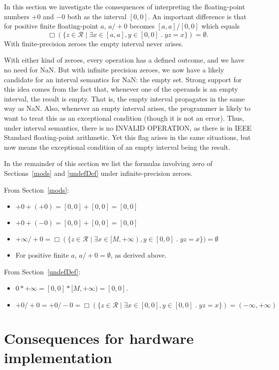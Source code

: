 \documentclass[11pt]{article}
\newcommand{\R}{\mathcal{R}}
\begin{document}
In this section we investigate the consequences of interpreting the
floating-point numbers $+0$ and $-0$ both as the interval $[0,0]$.  An
important difference is that for positive finite floating-point $a$,
$a/+0$ becomes $[a,a]/[0,0]$ which equals
$$\Box(\{z \in \R  \mid \exists x \in [a,a], y \in [0,0] \;.\;
yz = x \}) = \emptyset.$$
With finite-precision zeroes the empty interval never arises.

With either kind of zeroes, every operation has a defined outcome, and
we have no need for NaN.  But with infinite precision zeroes, we
now have a likely candidate for an interval semantics for NaN: the
empty set. Strong support for this idea comes from the fact that,
whenever one of the operands is an empty interval, the result is
empty. That is, the empty interval propagates in the same way as
NaN. Also, whenever an empty interval arises, the programmer is likely to
want to treat this as an exceptional condition (though it is not an
error). Thus, under interval semantics, there is no INVALID OPERATION,
as there is in IEEE Standard floating-point arithmetic. Yet this flag
arises in the same situations, but now means the exceptional condition
of an empty interval being the result.

In the remainder of this section we list the formulas involving zero of
Sections~\ref{mods} and \ref{undefDef} under infinite-precision zeroes.

From Section~\ref{mods}:
\begin{itemize}
\item
$+0 + (+0) = [0,0] + [0,0] = [0,0]$
\item
$+0 + (-0) = [0,0] + [0,0] = [0,0]$
\item $+\infty/+0 = \Box(\{z \in \R \mid \exists x \in [M,+\infty), y
  \in [0,0] \;.\; yz = x \}) = \emptyset $
\item
For positive finite $a$,
$a/+0 = \emptyset$, as derived above.
\end{itemize}

From Section~\ref{undefDef}:
 
\begin{itemize}
\item
$0 * +\infty = [0,0]*[M,+\infty) = [0,0]$.
\item
$+0/+0 = +0/-0 =
\Box(\{z \in \R  \mid \exists x \in [0,0], y \in [0,0] \;.\;
yz = x \}) = (-\infty,+\infty)$
\end{itemize}


\section{Consequences for hardware implementation}
\label{hardwCons}
\end{document}
